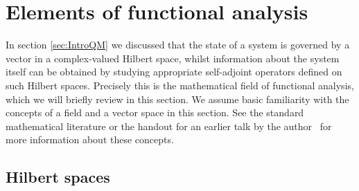 \section{Elements of functional analysis}

In section \vref{sec:IntroQM} we discussed that the state
of a \QM system is governed by a vector in a complex-valued Hilbert space,
whilst information about the system itself can be obtained by studying
appropriate self-adjoint operators defined on such Hilbert spaces.
Precisely this is the mathematical field of functional analysis,
which we will briefly review in this section.
We assume basic familiarity with the concepts of a field and a vector space
in this section.
See the standard mathematical literature or the handout for an earlier talk
by the author~\cite{DiracNotation} for more information about these concepts.


\subsection{Hilbert spaces}
\label{sec:Hilbert}








